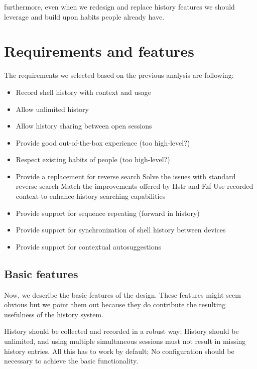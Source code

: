 \documentclass[thesis=M,english]{FITthesis}[2012/10/20]
\begin{document}
furthermore, even when we redesign and replace history features we should leverage and build upon habits people already have.



\section{Requirements and features}


The requirements we selected based on the previous analysis are following:

\begin{itemize}
    \item Record shell history with context and usage
    \item Allow unlimited history
    \item Allow history sharing between open sessions
    \item Provide good out-of-the-box experience (too high-level?)
    \item Respect existing habits of people (too high-level?)
    \item Provide a replacement for reverse search
    \subitem Solve the issues with standard reverse search
    \subitem Match the improvements offered by Hstr and Fzf
    \subitem Use recorded context to enhance history searching capabilities
    \item Provide support for sequence repeating (forward in history)
    \item Provide support for synchronization of shell history between devices
    \item Provide support for contextual autosuggestions
\end{itemize}



\subsection{Basic features}

Now, we describe the basic features of the design. These features might seem obvious but we point them out because they do contribute the resulting usefulness of the history system.

History should be collected and recorded in a robust way; History should be unlimited, and using multiple simultaneous sessions must not result in missing history entries. All this has to work by default; No configuration should be necessary to achieve the basic functionality. 
\end{document}
